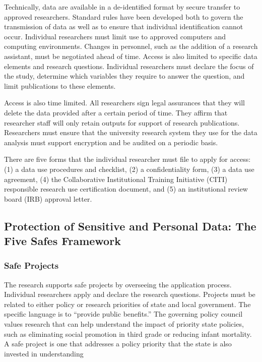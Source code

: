 \documentclass[
]{WileySix}
\begin{document}
Technically, data are available in a de-identified format by secure transfer to approved researchers. Standard rules have been developed both to govern the transmission of data as well as to ensure that individual identification cannot occur. Individual researchers must limit use to approved computers and computing environments. Changes in personnel, such as the addition of a research assistant, must be negotiated ahead of time. Access is also limited to specific data elements and research questions. Individual researchers must declare the focus of the study, determine which variables they require to answer the question, and limit publications to these elements.

Access is also time limited. All researchers sign legal assurances that they will delete the data provided after a certain period of time. They affirm that researcher staff will only retain outputs for support of research publications. Researchers must ensure that the university research system they use for the data analysis must support encryption and be audited on a periodic basis.

There are five forms that the individual researcher must file to apply for access: (1) a data use procedures and checklist, (2) a confidentiality form, (3) a data use agreement, (4) the Collaborative Institutional Training Initiative (CITI) responsible research use certification document, and (5) an institutional review board (IRB) approval letter.

\hypertarget{protection-of-sensitive-and-personal-data-the-five-safes-framework-1}{%
\subsection{Protection of Sensitive and Personal Data: The Five Safes Framework}\label{protection-of-sensitive-and-personal-data-the-five-safes-framework-1}}

\hypertarget{safe-projects-1}{%
\subsubsection{Safe Projects}\label{safe-projects-1}}

The research supports safe projects by overseeing the application process. Individual researchers apply and declare the research questions. Projects must be related to either policy or research priorities of state and local government. The specific language is to ``provide public benefits.'' The governing policy council values research that can help understand the impact of priority state policies, such as eliminating social promotion in third grade or reducing infant mortality. A safe project is one that addresses a policy priority that the state is also invested in understanding
\end{document}
